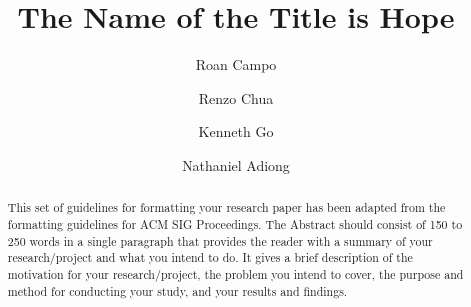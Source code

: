 \documentclass[sigconf, pbalance]{acmart}
\begin{document}
\title{The Name of the Title is Hope}


\author{Roan Campo}

\author{Renzo Chua}

\author{Kenneth Go}

\author{Nathaniel Adiong}

\renewcommand{\shortauthors}{Trovato et al.}


\begin{abstract}
This set of guidelines for formatting your research paper has been adapted from the formatting guidelines for ACM SIG Proceedings. The Abstract should consist of 150 to 250 words in a single paragraph that provides the reader with a summary of your research/project and what you intend to do. It gives a brief description of the motivation for your research/project, the problem you intend to cover, the purpose and method for conducting your study, and your results and findings.
\end{abstract}



\maketitle
\end{document}
